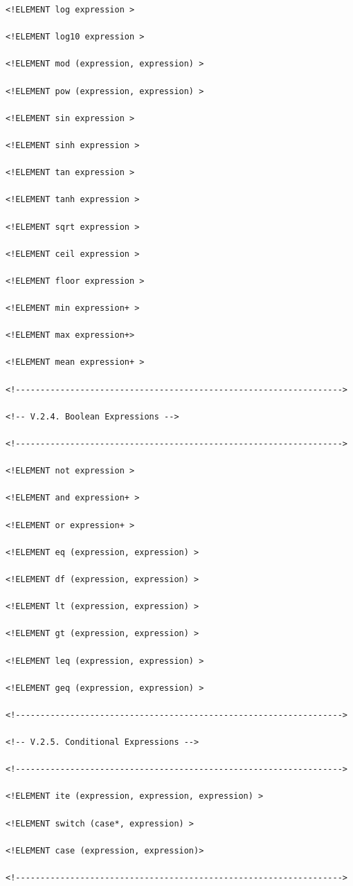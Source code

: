 \documentclass[11pt]{article}
\begin{document}
\begin{lstlisting}
<!ELEMENT log expression >

<!ELEMENT log10 expression >

<!ELEMENT mod (expression, expression) >

<!ELEMENT pow (expression, expression) >

<!ELEMENT sin expression >

<!ELEMENT sinh expression >

<!ELEMENT tan expression >

<!ELEMENT tanh expression >

<!ELEMENT sqrt expression >

<!ELEMENT ceil expression >

<!ELEMENT floor expression >

<!ELEMENT min expression+ >

<!ELEMENT max expression+>

<!ELEMENT mean expression+ >

<!------------------------------------------------------------------>

<!-- V.2.4. Boolean Expressions -->

<!------------------------------------------------------------------>

<!ELEMENT not expression >

<!ELEMENT and expression+ >

<!ELEMENT or expression+ >

<!ELEMENT eq (expression, expression) >

<!ELEMENT df (expression, expression) >

<!ELEMENT lt (expression, expression) >

<!ELEMENT gt (expression, expression) >

<!ELEMENT leq (expression, expression) >

<!ELEMENT geq (expression, expression) >

<!------------------------------------------------------------------>

<!-- V.2.5. Conditional Expressions -->

<!------------------------------------------------------------------>

<!ELEMENT ite (expression, expression, expression) >

<!ELEMENT switch (case*, expression) >

<!ELEMENT case (expression, expression)>

<!------------------------------------------------------------------>


\end{lstlisting}
\end{document}
